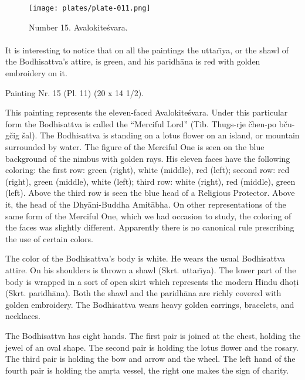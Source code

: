 \documentclass[a4paper, 12pt, oneside]{article}
\begin{document}
\clearpage
\vspace*{\fill}
\begin{figure}[H]
\centering
\texttt{[image: plates/plate-011.png]}
\caption*{Number 15. Avalokite\'{s}vara.}
\end{figure}
\vspace*{\fill}
\clearpage
\paragraph{}
It is interesting to notice that on all the paintings the uttar\={\i}ya, or the shawl of the Bodhisattva's attire, is green, and his paridh\={a}na is red with golden embroidery on it.

\bigskip

Painting Nr. 15 (Pl. 11) (20 x 14 1/2).

\bigskip

This painting represents the eleven-faced Avalokite\'{s}vara. Under this particular form the Bodhisattva is called the ``Merciful Lord'' (Tib. Thugs-rje čhen-po bču-gčig šal). The Bodhisattva is standing on a lotus flower on an island, or mountain surrounded by water. The figure of the Merciful One is seen on the blue background of the nimbus with golden rays. His eleven faces have the following coloring: the first row: green (right), white (middle), red (left); second row: red (right), green (middle), white (left); third row: white (right), red (middle), green (left). Above the third row is seen the blue head of a Religious Protector. Above it, the head of the Dhy\={a}ni-Buddha Amit\={a}bha. On other representations of the same form of the Merciful One, which we had occasion to study, the coloring of the faces was slightly different. Apparently there is no canonical rule prescribing the use of certain colors.

The color of the Bodhisattva's body is white. He wears the usual Bodhisattva attire. On his shoulders is thrown a shawl (Skrt. uttar\={\i}ya). The lower part of the body is wrapped in a sort of open skirt which represents the modern Hindu dho\d{t}i (Skrt. paridh\={a}na). Both the shawl and the paridh\={a}na are richly covered with golden embroidery. The Bodhisattva wears heavy golden earrings, bracelets, and necklaces.

The Bodhisattva has eight hands. The first pair is joined at the chest, holding the jewel of an oval shape. The second pair is holding the lotus flower and the rosary. The third pair is holding the bow and arrow and the wheel. The left hand of the fourth pair is holding the am\d{r}ta vessel, the right one makes the sign of charity.
\end{document}
